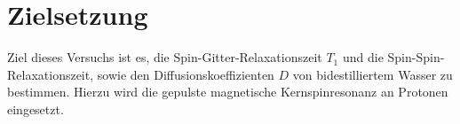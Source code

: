\section{Zielsetzung}
Ziel dieses Versuchs ist es, die Spin-Gitter-Relaxationszeit $T_1$ und die Spin-Spin-Relaxationszeit, sowie den Diffusionskoeffizienten $D$ von bidestilliertem Wasser zu bestimmen. Hierzu wird die gepulste magnetische Kernspinresonanz an Protonen eingesetzt.
